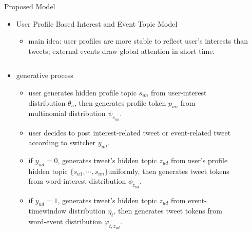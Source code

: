 \documentclass{beamer}
\begin{document}
\begin{frame}
\begin{columns}[T]
\begin{column}{.46\textwidth}
{\begin{block}{Proposed Model}
\begin{itemize}
\item User Profile Based Interest and Event Topic Model 
        \begin{itemize}
                \item main idea: user profiles are more stable to reflect user's interests than tweets; external events draw global attention in short time.
        \end{itemize}
\end{itemize}
\begin{columns}
        \begin{column}{.5\textwidth}
                \begin{itemize}
                        \item generative process
                        \begin{itemize}
                                \item \tiny{user generates hidden profile topic \(s_{un}\) from user-interest distribution \(\theta_u\), then generates profile token \(p_{un}\) from multinomial distribution \(\psi_{s_{un}}\).}
                                \item \tiny{user decides to post interest-related tweet or event-related tweet according to switcher \(y_{ud}\).}
                                \item \tiny{if \(y_{ud}=0\), generates tweet's hidden topic \(z_{ud}\) from user's profile hidden topic \(\{s_{u1},\cdots,s_{un}\} \)uniformly, then generates tweet tokens from word-interest distribution \(\phi_{z_{ud}}\).}
                                \item \tiny{if \(y_{ud}=1\), generates tweet's hidden topic \(z_{ud}\) from event-timewindow distribution \(\eta_t\), then generates tweet tokens from word-event distribution \(\varphi_{t,z_{ud}}\).}
                        \end{itemize}
                \end{itemize}
        \end{column}
        \begin{column}{.5\textwidth}
                \begin{figure}
                        \centering

\end{figure}
\end{column}
\end{columns}
\end{block}}
\end{column}
\end{columns}
\end{frame}
\end{document}

